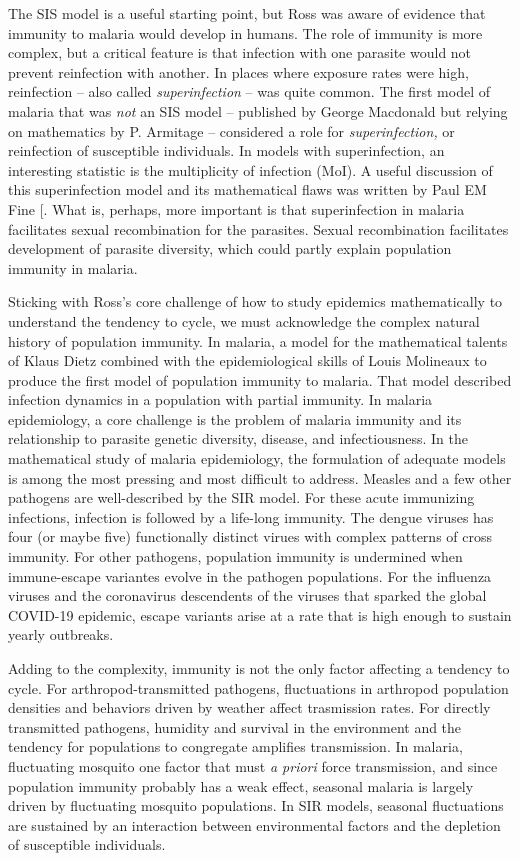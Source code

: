 \documentclass[
]{book}
\begin{document}
The SIS model is a useful starting point, but Ross was aware of evidence that immunity to malaria would develop in humans.
The role of immunity is more complex, but a critical feature is that infection with one parasite would not prevent reinfection with another.
In places where exposure rates were high, reinfection -- also called \emph{superinfection} -- was quite common.
The first model of malaria that was \emph{not} an SIS model -- published by George Macdonald but relying on mathematics by P. Armitage --
considered a role for \emph{superinfection,} or reinfection of susceptible individuals.
In models with superinfection, an interesting statistic is the multiplicity of infection (MoI).
A useful discussion of this superinfection model and its mathematical flaws was written by Paul EM Fine {[}\citeproc{ref-FinePEM1975SuperinfectionProblem}{51}{]}.
What is, perhaps, more important is that superinfection in malaria facilitates sexual recombination for the parasites.
Sexual recombination facilitates development of parasite diversity, which could partly explain population immunity in malaria.

Sticking with Ross's core challenge of how to study epidemics mathematically to understand the tendency to cycle, we must acknowledge
the complex natural history of population immunity. In malaria,
a model for the mathematical talents of Klaus Dietz combined with the epidemiological skills of Louis Molineaux to produce the first model of population immunity to malaria.
That model described infection dynamics in a population with partial immunity.
In malaria epidemiology, a core challenge is the problem of malaria immunity and its relationship to parasite genetic diversity, disease, and infectiousness.
In the mathematical study of malaria epidemiology, the formulation of adequate models is among the most pressing and most difficult to address.
Measles and a few other pathogens are well-described by the SIR model.
For these acute immunizing infections, infection is followed by a life-long immunity.
The dengue viruses has four (or maybe five) functionally distinct virues with complex patterns of cross immunity.
For other pathogens, population immunity is undermined when immune-escape variantes evolve in the pathogen populations.
For the influenza viruses and the coronavirus descendents of the viruses that sparked the global COVID-19 epidemic, escape variants arise at a rate that is high enough to sustain yearly outbreaks.

Adding to the complexity, immunity is not the only factor affecting a tendency to cycle.
For arthropod-transmitted pathogens, fluctuations in arthropod population densities and behaviors driven by weather affect trasmission rates.
For directly transmitted pathogens, humidity and survival in the environment and the tendency for populations to congregate amplifies transmission.
In malaria, fluctuating mosquito one factor that must \emph{a priori} force transmission, and since population immunity probably has a weak effect,
seasonal malaria is largely driven by fluctuating mosquito populations.
In SIR models, seasonal fluctuations are sustained by an interaction between environmental factors and the depletion of susceptible individuals.
\end{document}
